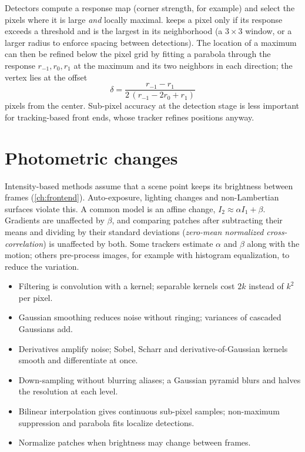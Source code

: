 Detectors compute a response map (corner strength, for example) and select the pixels where it is large \emph{and} locally maximal. 
keeps a pixel only if its response exceeds a threshold and is the largest in its neighborhood (a $3\times3$ window, or a larger radius to enforce spacing between
detections). The location of a maximum can then be refined below the pixel grid by fitting a parabola through the response $r_{-1}, r_0, r_1$ at the maximum and its two
neighbors in each direction; the vertex lies at the offset
\begin{equation}
  \delta = \frac{r_{-1} - r_{1}}{2\,(r_{-1} - 2r_0 + r_{1})}
\end{equation}
pixels from the center. Sub-pixel accuracy at the detection stage is less important for tracking-based front ends, whose tracker refines positions anyway.

\section{Photometric changes}

Intensity-based methods assume that a scene point keeps its brightness between frames (\cref{ch:frontend}). Auto-exposure, lighting changes and non-Lambertian
surfaces violate this. A common model is an affine change, $I_2 \approx \alpha I_1 + \beta$. Gradients are unaffected by $\beta$, and comparing patches after subtracting their
means and dividing by their standard deviations (\emph{zero-mean normalized cross-correlation}) is unaffected by both. Some trackers estimate $\alpha$ and $\beta$
along with the motion; others pre-process images, for example with histogram equalization, to reduce the variation.

\begin{takeaways}
\begin{itemize}
  \item Filtering is convolution with a kernel; separable kernels cost $2k$ instead of $k^2$ per pixel.
  \item Gaussian smoothing reduces noise without ringing; variances of cascaded Gaussians add.
  \item Derivatives amplify noise; Sobel, Scharr and derivative-of-Gaussian kernels smooth and differentiate at once.
  \item Down-sampling without blurring aliases; a Gaussian pyramid blurs and halves the resolution at each level.
  \item Bilinear interpolation gives continuous sub-pixel samples; non-maximum suppression and parabola fits localize detections.
  \item Normalize patches when brightness may change between frames.
\end{itemize}
\end{takeaways}

